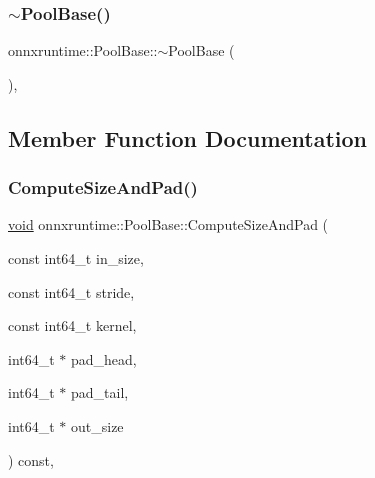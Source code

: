 \mbox{\label{classonnxruntime_1_1PoolBase_a170ff68bb0fefc4f2bf365a35a7691d3}} 
\subsubsection{\texorpdfstring{$\sim$\+Pool\+Base()}{~PoolBase()}}
{\footnotesize\ttfamily onnxruntime\+::\+Pool\+Base\+::$\sim$\+Pool\+Base (\begin{DoxyParamCaption}{ }\end{DoxyParamCaption})\hspace{0.3cm}{\ttfamily [inline]}, {\ttfamily [protected]}}



\subsection{Member Function Documentation}
\mbox{\label{classonnxruntime_1_1PoolBase_ab9c9f378646859e71ecd332088797b6a}} 
\subsubsection{\texorpdfstring{Compute\+Size\+And\+Pad()}{ComputeSizeAndPad()}}
{\footnotesize\ttfamily \mbox{\hyperlink{mlasi_8h_a88f941d423cb2a819b70a1358982b1a6}{void}} onnxruntime\+::\+Pool\+Base\+::\+Compute\+Size\+And\+Pad (\begin{DoxyParamCaption}\item[{const int64\+\_\+t}]{in\+\_\+size,  }\item[{const int64\+\_\+t}]{stride,  }\item[{const int64\+\_\+t}]{kernel,  }\item[{int64\+\_\+t $\ast$}]{pad\+\_\+head,  }\item[{int64\+\_\+t $\ast$}]{pad\+\_\+tail,  }\item[{int64\+\_\+t $\ast$}]{out\+\_\+size }\end{DoxyParamCaption}) const\hspace{0.3cm}{\ttfamily [inline]}, {\ttfamily [protected]}}

